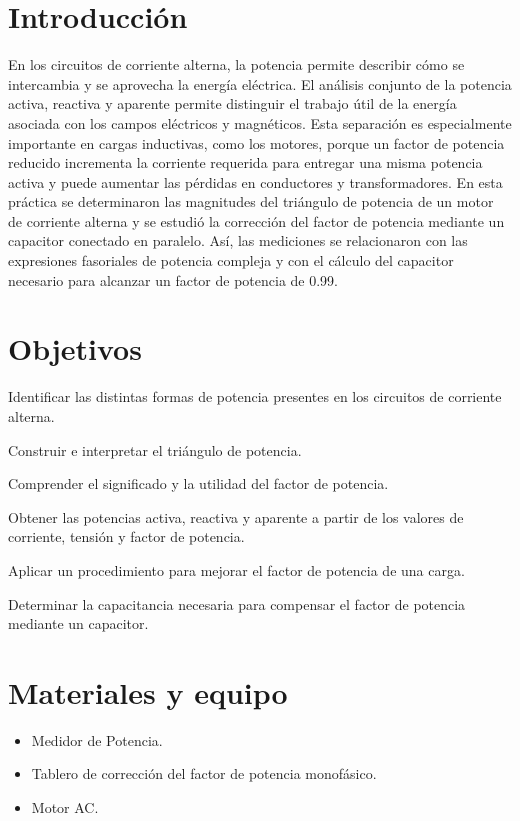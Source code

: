 \documentclass[12pt,a4paper]{article}
\begin{document}
\section{Introducción}
En los circuitos de corriente alterna, la potencia permite describir cómo se intercambia y se aprovecha la energía eléctrica. El análisis conjunto de la potencia activa, reactiva y aparente permite distinguir el trabajo útil de la energía asociada con los campos eléctricos y magnéticos. Esta separación es especialmente importante en cargas inductivas, como los motores, porque un factor de potencia reducido incrementa la corriente requerida para entregar una misma potencia activa y puede aumentar las pérdidas en conductores y transformadores. En esta práctica se determinaron las magnitudes del triángulo de potencia de un motor de corriente alterna y se estudió la corrección del factor de potencia mediante un capacitor conectado en paralelo. Así, las mediciones se relacionaron con las expresiones fasoriales de potencia compleja y con el cálculo del capacitor necesario para alcanzar un factor de potencia de 0.99.

\section{Objetivos}
\begin{itemsinforme}
    \item Identificar las distintas formas de potencia presentes en los circuitos de corriente alterna.
    \item Construir e interpretar el triángulo de potencia.
    \item Comprender el significado y la utilidad del factor de potencia.
    \item Obtener las potencias activa, reactiva y aparente a partir de los valores de corriente, tensión y factor de potencia.
    \item Aplicar un procedimiento para mejorar el factor de potencia de una carga.
    \item Determinar la capacitancia necesaria para compensar el factor de potencia mediante un capacitor.
\end{itemsinforme}

\section{Materiales y equipo}
\begin{itemize}
    \item Medidor de Potencia.
    \item Tablero de corrección del factor de potencia monofásico.
    \item Motor AC.\@
\end{itemize}
\end{document}
